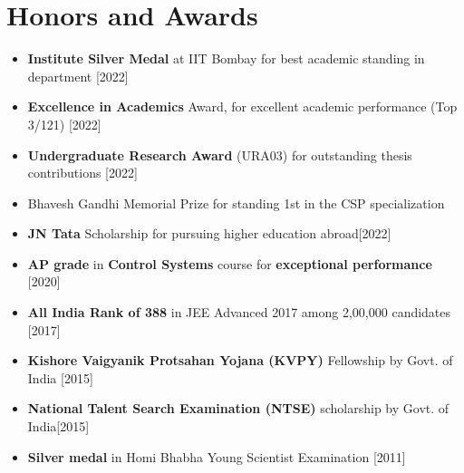 \documentclass[10pt,letterpaper,sans]{moderncv}
\begin{document}
\section{Honors and Awards}
\begin{itemize}
\item \textbf{Institute Silver Medal} at IIT Bombay for best academic standing in department \hfill{\small [2022]}
\item \textbf{Excellence in Academics} Award, for excellent academic performance (Top 3/121) \hfill{\small [2022]}
\item \textbf{Undergraduate Research Award} (URA03) for outstanding thesis contributions \hfill{\small [2022]}
\item Bhavesh Gandhi Memorial Prize for standing 1st in the CSP specialization
\item \textbf{JN Tata} Scholarship for pursuing higher education abroad\hfill {\small[2022]}
\item \textbf{AP grade} in \textbf{Control Systems} course for \textbf{exceptional performance} \hfill{\small [2020]}
\item \textbf{All India Rank of 388} in JEE Advanced 2017 among 2,00,000 candidates \hfill {\small [2017]}
\item \textbf{Kishore Vaigyanik Protsahan Yojana (KVPY)} Fellowship by Govt. of India \hfill{\small [2015]}
\item \textbf{National Talent Search Examination (NTSE)} scholarship by Govt. of India\hfill{\small [2015]}
\item \textbf{Silver medal} in Homi Bhabha Young Scientist Examination \hfill{\small [2011]}
\end{itemize}
\vspace{-10pt}
\end{document}
